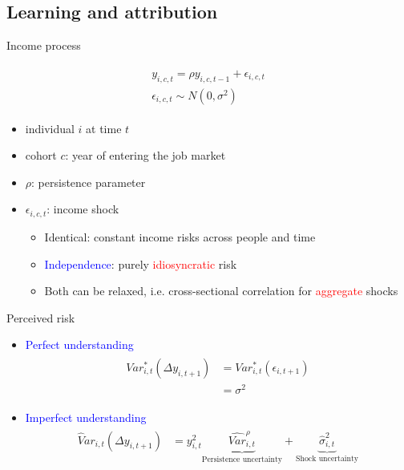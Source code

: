 \documentclass{beamer}
\begin{document}
\subsection{Learning and attribution}

\begin{frame}{Income process}
	
	\begin{eqnarray}
		\begin{split}
			y_{i,c,t} = \rho y_{i,c,t-1} + \epsilon_{i,c,t} \\
			\epsilon_{i,c,t} \sim  N(0,\sigma^2)
		\end{split}
	\end{eqnarray}
	
	\begin{itemize}
		\item individual \(i\) at time
		\(t\) 
		\item cohort $c$: year of entering the job market 
		\item $\rho$: persistence parameter
		\item \(\epsilon_{i,c,t}\): income shock 
		\begin{itemize}
			\item Identical: constant income risks across people and time
			\item \textcolor{blue}{Independence}: purely \textcolor{red}{idiosyncratic} risk 
			\item  Both can be relaxed, i.e. cross-sectional correlation for \textcolor{red}{aggregate} shocks 
		\end{itemize}
	\end{itemize}
\end{frame}

\begin{frame}{Perceived risk}
	\begin{itemize}
		\item \textcolor{blue}{Perfect understanding}
		\begin{eqnarray}
			\begin{split}
				Var^*_{i,t}(\Delta y_{i,t+1}) & = Var^*_{i,t}(\epsilon_{i,t+1}) \\
				& = \sigma^2
			\end{split}
		\end{eqnarray}
		\item \textcolor{blue}{Imperfect understanding} 
		\begin{eqnarray}
			\begin{split}
				\widehat Var_{i,t}(\Delta y_{i,t+1}) & = y_{i,t}^2 \underbrace{\widehat{Var}^{\rho}_{i,t}}_{\text{Persistence uncertainty}} + \underbrace{\hat{\sigma}^2_{i,t}}_{\text{Shock uncertainty}}
			\end{split}
		\end{eqnarray}
	\end{itemize}	
\end{frame}
\end{document}
